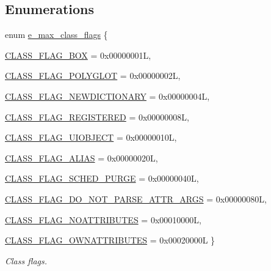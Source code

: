 \subsection*{Enumerations}
\begin{DoxyCompactItemize}
\item 
enum \hyperlink{group__class_ga124a08e1744d9e999211abaa9df9f556}{e\_\-max\_\-class\_\-flags} \{ \par
\hyperlink{group__class_gga124a08e1744d9e999211abaa9df9f556af008530d0bd6c2091fe85923e412834f}{CLASS\_\-FLAG\_\-BOX} =  0x00000001L, 
\par
\hyperlink{group__class_gga124a08e1744d9e999211abaa9df9f556ac72d734fc04a3c47be53a77b1682b753}{CLASS\_\-FLAG\_\-POLYGLOT} =  0x00000002L, 
\par
\hyperlink{group__class_gga124a08e1744d9e999211abaa9df9f556aab2bebd8a64110247fa11db1c13ca5eb}{CLASS\_\-FLAG\_\-NEWDICTIONARY} =  0x00000004L, 
\par
\hyperlink{group__class_gga124a08e1744d9e999211abaa9df9f556a2ecc4a934743139d88d39fc62d028614}{CLASS\_\-FLAG\_\-REGISTERED} =  0x00000008L, 
\par
\hyperlink{group__class_gga124a08e1744d9e999211abaa9df9f556acdc1b6c10a366457cca2ea5e01964d80}{CLASS\_\-FLAG\_\-UIOBJECT} =  0x00000010L, 
\par
\hyperlink{group__class_gga124a08e1744d9e999211abaa9df9f556aa44754fe97e81d80049c2647fb4d6a62}{CLASS\_\-FLAG\_\-ALIAS} =  0x00000020L, 
\par
\hyperlink{group__class_gga124a08e1744d9e999211abaa9df9f556a940889608b4f23b1fcb24ebbf70772aa}{CLASS\_\-FLAG\_\-SCHED\_\-PURGE} =  0x00000040L, 
\par
\hyperlink{group__class_gga124a08e1744d9e999211abaa9df9f556a99981e2a6df832c0f59871193f2060a5}{CLASS\_\-FLAG\_\-DO\_\-NOT\_\-PARSE\_\-ATTR\_\-ARGS} =  0x00000080L, 
\par
\hyperlink{group__class_gga124a08e1744d9e999211abaa9df9f556aa8a5af40c8083496ee03dd3480087eee}{CLASS\_\-FLAG\_\-NOATTRIBUTES} =  0x00010000L, 
\par
\hyperlink{group__class_gga124a08e1744d9e999211abaa9df9f556a2c12440c31196a04f5ab4883a2334659}{CLASS\_\-FLAG\_\-OWNATTRIBUTES} =  0x00020000L
 \}
\begin{DoxyCompactList}\small\item\em Class flags. \item\end{DoxyCompactList}\end{DoxyCompactItemize}
